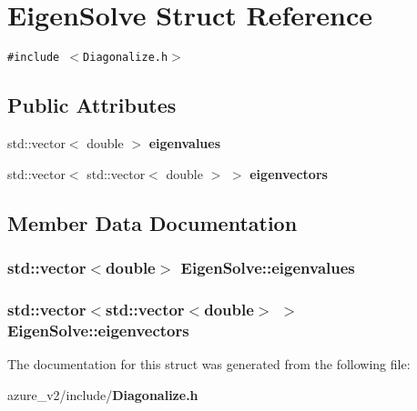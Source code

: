 \section{Eigen\-Solve Struct Reference}
\label{structEigenSolve}
{\tt \#include $<$Diagonalize.h$>$}

\subsection*{Public Attributes}
\begin{CompactItemize}
\item 
std::vector$<$ double $>$ \bf{eigenvalues}
\item 
std::vector$<$ std::vector$<$ double $>$ $>$ \bf{eigenvectors}
\end{CompactItemize}


\subsection{Member Data Documentation}
\subsubsection{\setlength{\rightskip}{0pt plus 5cm}std::vector$<$double$>$ \bf{Eigen\-Solve::eigenvalues}}\label{structEigenSolve_e9ff494f15648845a1db28e365441e20}


\subsubsection{\setlength{\rightskip}{0pt plus 5cm}std::vector$<$std::vector$<$double$>$ $>$ \bf{Eigen\-Solve::eigenvectors}}\label{structEigenSolve_8bc63025bab194b1c5f80bcde465a117}




The documentation for this struct was generated from the following file:\begin{CompactItemize}
\item 
azure\_\-v2/include/\bf{Diagonalize.h}\end{CompactItemize}
